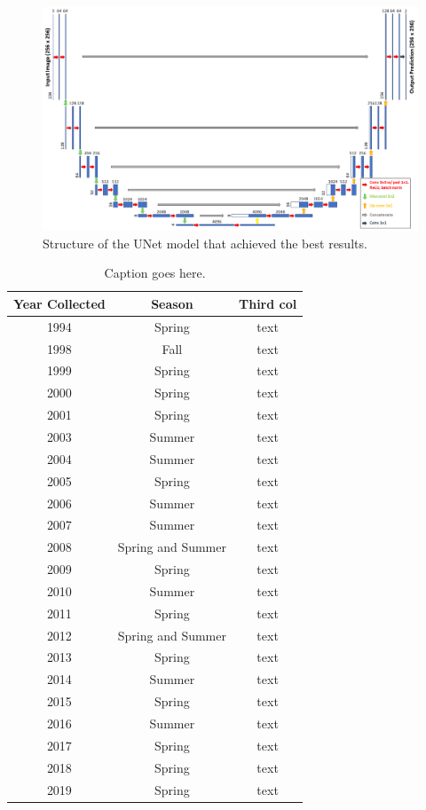 \documentclass[acmtog, authorversion]{acmart}
\begin{document}
\begin{figure}[t]
  \includegraphics[width=0.7\linewidth]{Images/UNetModel.png}
  \caption{Structure of the UNet model that achieved the best results.}
  \label{fig:model}
\end{figure}

\begin{table}[b]
    \caption{Caption goes here.}
    \label{tab:avail}
    \begin{tabular}{c|c|c}
        \toprule
        Year Collected & Season & Third col\\
        \midrule
        1994 & Spring & text\\
        1998 & Fall & text\\
        1999 & Spring & text\\
        2000 & Spring & text\\
        2001 & Spring & text\\
        2003 & Summer & text\\
        2004 & Summer & text\\
        2005 & Spring & text\\
        2006 & Summer & text\\
        2007 & Summer & text\\
        2008 & Spring and Summer & text\\
        2009 & Spring & text\\
        2010 & Summer & text\\
        2011 & Spring & text\\
        2012 & Spring and Summer & text\\
        2013 & Spring & text\\
        2014 & Summer & text\\
        2015 & Spring & text\\
        2016 & Summer & text\\
        2017 & Spring & text\\
        2018 & Spring & text\\
        2019 & Spring & text\\
        \bottomrule
    \end{tabular}
\end{table}
\end{document}
